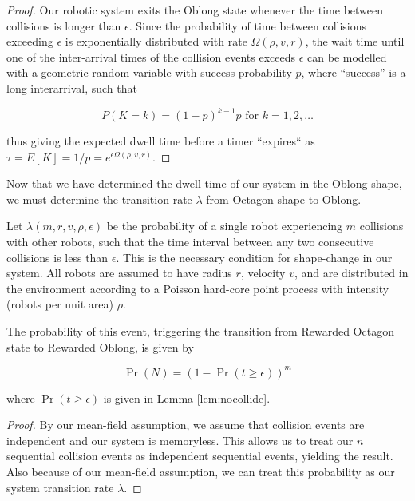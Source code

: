 \documentclass[runningheads]{llncs}
\begin{document}
\begin{proof}
Our robotic system exits the Oblong state whenever the time between collisions is longer than $\epsilon$. Since the probability of time between collisions exceeding $\epsilon$ is exponentially distributed with rate $\Omega(\rho, v, r)$, the wait time until one of the inter-arrival times of the collision events exceeds $\epsilon$ can be modelled with a geometric random variable with success probability $p$, where ``success'' is a long interarrival, such that

\begin{equation*}
P(K=k)=(1-p)^{k-1}p \text{ for $k=1,2,\dots$}
\end{equation*}

thus giving the expected dwell time before a timer ``expires`` as $\tau = E[K]=1/p=e^{\epsilon \Omega(\rho, v, r)}$. 

\end{proof}

Now that we have determined the dwell time of our system in the Oblong shape, we must determine the transition rate $\lambda$ from Octagon shape to Oblong.


  \begin{lemma}
Let $\lambda(m, r, v, \rho, \epsilon)$ be the probability of a single robot experiencing $m$ collisions with other robots, such that the time interval between any two consecutive collisions is less than $\epsilon$. This is the necessary condition for shape-change in our system. All robots are assumed to have radius $r$, velocity $v$, and are distributed in the environment according to a Poisson hard-core point process with intensity (robots per unit area) $\rho$.
  
The probability of this event, triggering the transition from Rewarded Octagon state to Rewarded Oblong, is given by

\begin{equation*}
\Pr(N) = (1 - \Pr(t \geq \epsilon))^m
\end{equation*}

where $\Pr( t \geq \epsilon)$ is given in Lemma \ref{lem:nocollide}.
  \end{lemma}

\begin{proof}
    By our mean-field assumption, we assume that collision events are independent and our system is memoryless. This allows us to treat our $n$ sequential collision events as independent sequential events, yielding the result. Also because of our mean-field assumption, we can treat this probability as our system transition rate $\lambda$.
\end{proof}
\end{document}
